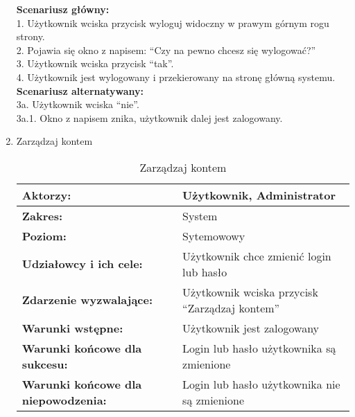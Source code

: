 \begin{enumerate}[label=(\Roman*)]
\textbf{Scenariusz główny:} \\
1. Użytkownik wciska przycisk wyloguj widoczny w prawym górnym rogu strony. \\
2. Pojawia się okno z napisem: “Czy na pewno chcesz się wylogować?” \\
3. Użytkownik wciska przycisk “tak”. \\
4. Użytkownik jest wylogowany i przekierowany na stronę główną systemu. \\
\textbf{Scenariusz alternatywany:}\\ 
3a. Użytkownik wciska “nie”. \\
3a.1. Okno z napisem znika, użytkownik dalej jest zalogowany. \\
\item Zarządzaj kontem
\begin{table}[H]
\centering
\caption{Zarządzaj kontem}
\label{zarzadzajkontem}
\begin{tabular}{|p{7cm}|p{7cm}|}
  \hline 
  \textbf{Aktorzy:} & Użytkownik, Administrator\\
  \hline
  \textbf{Zakres:} & System \\
	\hline
  \textbf{Poziom:} & Sytemowowy \\
	\hline
  \textbf{Udziałowcy i ich cele: } & Użytkownik chce zmienić login lub hasło \\
	\hline
  \textbf{Zdarzenie wyzwalające: } & Użytkownik wciska przycisk “Zarządzaj kontem” \\
	\hline
  \textbf{Warunki wstępne: } & Użytkownik jest zalogowany\\
	\hline
  \textbf{Warunki końcowe dla sukcesu:} & Login lub hasło użytkownika są zmienione\\
	\hline
  \textbf{Warunki końcowe dla niepowodzenia:} & Login lub hasło użytkownika nie są zmienione \\
  \hline
\end{tabular} 
\end{table}


\end{enumerate}
